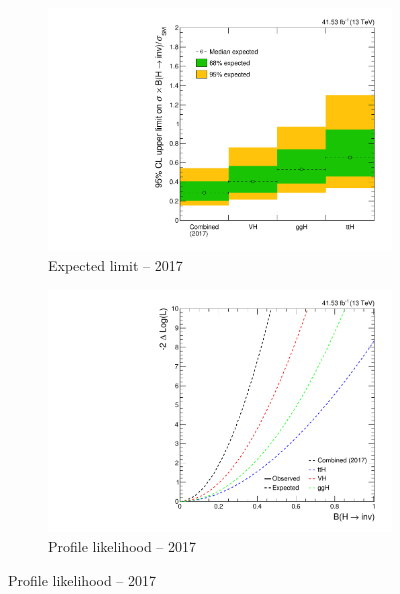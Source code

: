 \begin{figure}[htbp]
    \label{fig:htoinv_limit_likelihood_2016}
\end{figure}

\begin{figure}[htbp]
    \centering
    \begin{subfigure}[t]{0.45\textwidth}
        \includegraphics[width=\textwidth]{figures/limits/per_year/limit_2017_comb_Scenario5.pdf}
        \caption{Expected limit -- 2017}
    \end{subfigure}
    \hspace{0.05\textwidth}
    \begin{subfigure}[t]{0.45\textwidth}
        \includegraphics[width=\textwidth]{figures/likelihood_scan/profile_likelihood_scan_2017_Scenario5.pdf}
        \caption{Profile likelihood -- 2017}
    \end{subfigure}

\end{figure}
